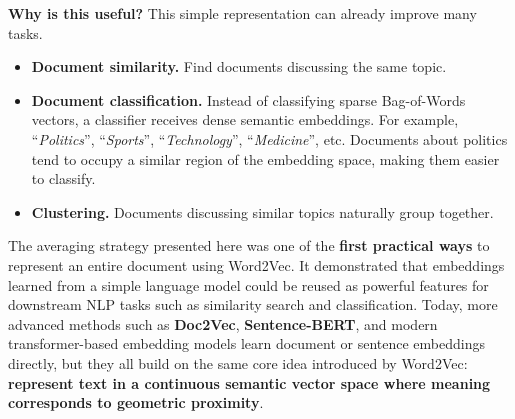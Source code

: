 \highspace
\textcolor{Green3}{ \textbf{Why is this useful?}} This simple representation can already improve many tasks.
\begin{itemize}
    \item[\textcolor{Green3}{\faIcon{check}}] \textcolor{Green3}{\textbf{Document similarity.}} Find documents discussing the same topic.
    \item[\textcolor{Green3}{\faIcon{check}}] \textcolor{Green3}{\textbf{Document classification.}} Instead of classifying sparse Bag-of-Words vectors, a classifier receives dense semantic embeddings. For example, ``\emph{Politics}'', ``\emph{Sports}'', ``\emph{Technology}'', ``\emph{Medicine}'', etc. Documents about politics tend to occupy a similar region of the embedding space, making them easier to classify.
    \item[\textcolor{Green3}{\faIcon{check}}] \textcolor{Green3}{\textbf{Clustering.}}  Documents discussing similar topics naturally group together.
\end{itemize}
The averaging strategy presented here was one of the \textbf{first practical ways} to represent an entire document using Word2Vec. It demonstrated that embeddings learned from a simple language model could be reused as powerful features for downstream NLP tasks such as similarity search and classification. Today, more advanced methods such as \textbf{Doc2Vec}, \textbf{Sentence-BERT}, and modern transformer-based embedding models learn document or sentence embeddings directly, but they all build on the same core idea introduced by Word2Vec: \textbf{represent text in a continuous semantic vector space where meaning corresponds to geometric proximity}.